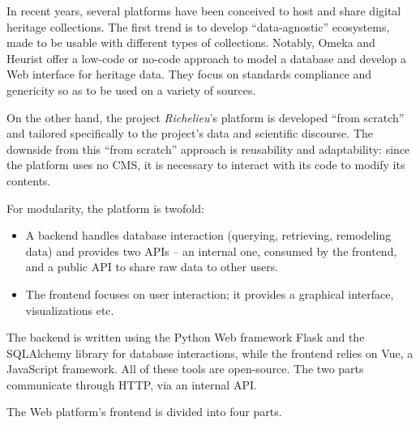 \documentclass[12pt, a4paper, twocolumn]{article}
\begin{document}
In recent years, several platforms have been conceived to host and share digital heritage collections. The first trend is to develop ``data-agnostic'' ecosystems, made to be usable with different types of collections. Notably, Omeka \parencite{Omeka2015} and Heurist \parencite{johnsonHeurist2017} offer a low-code or no-code approach to model a database and develop a Web interface for heritage data. They focus on standards compliance and genericity so as to be used on a variety of sources. 

On the other hand, the project \textit{Richelieu}'s platform is developed ``from scratch'' and tailored specifically to the project's data and scientific discourse. The downside from this ``from scratch'' approach is reusability and adaptability: since the platform uses no CMS, it is necessary to interact with its  code to modify its contents.

For modularity, the platform is twofold:
\begin{itemize}
    \item A backend handles database interaction (querying, retrieving, remodeling data) and provides two APIs -- an internal one, consumed by the frontend, and a public API to share raw data to other users.
    \item The frontend focuses on user interaction; it provides a graphical interface, visualizations etc. 
\end{itemize}

The backend is written using the Python Web framework Flask and the SQLAlchemy library for database interactions, while the frontend relies on Vue, a JavaScript framework. All of these tools are open-source. The two parts communicate through HTTP, via an internal API. 

The Web platform's frontend is divided into four parts.
\end{document}
